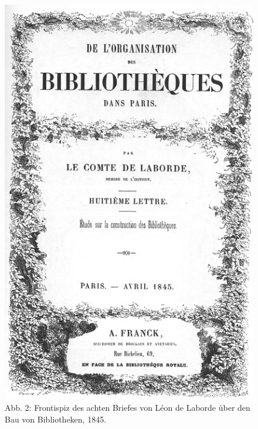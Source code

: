 \begin{figure}[htbp]
\centering
\includegraphics{img/wagner-2.jpg}
\caption*{Abb. 2: Frontispiz des achten Briefes von Léon de Laborde über
den Bau von Bibliotheken, 1845.}
\end{figure}

